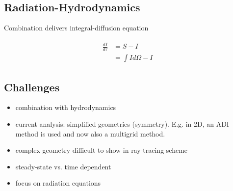 \documentclass[../main/main.tex]{subfiles}
\begin{document}
\subsection{Radiation-Hydrodynamics}
Combination delivers integral-diffusion equation

\begin{eqnarray}
\begin{aligned}
\frac{dI}{d\tau} &=  S - I \\
	&= \int I d\Omega - I
\end{aligned}
\end{eqnarray}

\subsection{Challenges}
\begin{itemize}
	\item combination with hydrodynamics
	\item current analysis: simplified geometries (symmetry). E.g. in 2D, an ADI method is used and now also a multigrid method. 
	\item complex geometry difficult to show in ray-tracing scheme
	\item steady-state vs. time dependent
	\item focus on radiation equations
\end{itemize}
\end{document}
